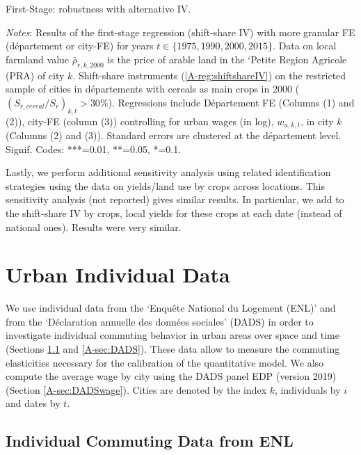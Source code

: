 \documentclass[11pt]{report}
\newcommand{\datatables}{../../output/data/tables}
\begin{document}
\begin{table}[hp!]
	\begin{center}
		
		\caption{First-Stage: robustness with alternative IV.\label{A-tab:1SLSshiftshare}}
	\end{center}
	{\footnotesize \textit{Notes}: Results of the first-stage regression (shift-share IV) with more granular FE (département or city-FE) for years $t \in \{1975, 1990, 2000, 2015\}$. Data on local farmland value $\bar{\rho}_{r,k,2000}$ is the price of arable land in the `Petite Region Agricole (PRA) of city $k$.  Shift-share instruments (\ref{A-reg:shiftshareIV}) on the restricted sample of cities in départements with cereals as main crops in 2000 ($(S_{r,cereal}/S_r)_{k,t}>30\%$). Regressions include Département FE (Columns (1) and (2)), city-FE (column (3))  controlling for urban wages (in log), $w_{u,k,t}$, in city $k$ (Columns (2) and (3)). Standard errors are clustered at the département level. Signif. Codes: ***=0.01, **=0.05, *=0.1.}
\end{table}

Lastly, we perform additional sensitivity analysis using related identification strategies using the data on yields/land use by crops across locations. This sensitivity analysis (not reported) gives similar results. In particular, we add to the shift-share IV by crops, local yields for these crops at each date (instead of national ones). Results were very similar. 

\pagebreak
\section{Urban Individual Data}\label{A-sec:urbanindividual}

We use individual data from the `Enquête National du Logement (ENL)' and from the `Déclaration annuelle des données sociales' (DADS) in order to investigate individual commuting behavior in urban areas over space and time (Sections \ref{A-sec:commuting} and \ref{A-sec:DADS}). These data allow to measure the commuting elasticities necessary for the calibration of the quantitative model. We also compute the average wage by city using the DADS panel EDP (version 2019) (Section \ref{A-sec:DADSwage}). Cities are denoted by the index $k$, individuals by $i$ and dates by $t$.

\subsection{Individual Commuting Data from ENL}\label{A-sec:commuting}
\end{document}
